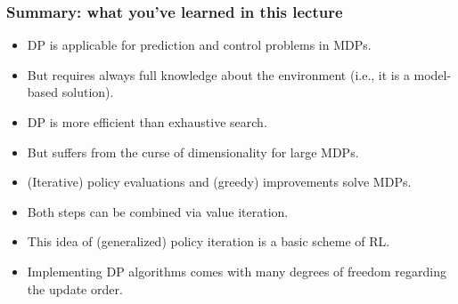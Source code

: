 \begin{frame}
\frametitle{Summary: what you've learned in this lecture}
\begin{itemize}
	\item DP is applicable for prediction and control problems in MDPs.\pause
	\item But requires always full knowledge about the environment (i.e., it is a model-based solution).\pause
	\item DP is more efficient than exhaustive search.\pause
	\item But suffers from the curse of dimensionality for large MDPs.\pause
	\item (Iterative) policy evaluations and (greedy) improvements solve MDPs.\pause
	\item Both steps can be combined via value iteration.\pause
	\item This idea of (generalized) policy iteration is a basic scheme of RL.\pause
	\item Implementing DP algorithms comes with many degrees of freedom regarding the update order.
\end{itemize}
\end{frame}
